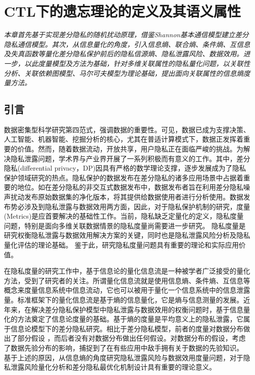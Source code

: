
\chapter{CTL下的遗忘理论的定义及其语义属性}\label{chapter03}
{\em 本章首先基于实现差分隐私的随机扰动原理，借鉴Shannon基本通信模型建立差分隐私通信模型。其次，从信息量化的角度，引入信息熵、联合熵、条件熵、互信息及失真函数等量化差分隐私保护前后的隐私信源熵、隐私泄露风险、数据效用。进一步，以此度量模型及方法为基础，针对多维关联属性的隐私量化问题，以关联性分析、关联依赖图模型、马尔可夫模型为理论基础，提出面向关联属性的信息熵度量方法。}

\section{引言}
数据密集型科学研究第四范式\cite{hey2009the}，强调数据的重要性。可见，数据已成为支撑决策、人工智能、机器智能、挖掘分析的核心，尤其在普适计算模式下，数据正发挥着重要的价值。然而，随着数据流动，开放共享，用户隐私正在面临严峻的挑战。为解决隐私泄露问题，学术界与产业界开展了一系列积极而有意义的工作。其中，差分隐私(differential privacy，DP)\cite{dwork2006differential,dwork2006calibrating}因具有严格的数学理论支撑，逐步发展成为了隐私保护领域研究的热点。隐私保护的数据发布在差分隐私的诸多应用场景中占据着重要的地位。如在差分隐私的非交互式数据发布中，数据发布者旨在利用差分隐私噪声扰动发布原始数据集的净化版本，将其提供给数据使用者进行分析使用。数据发布势必涉及到隐私泄露与数据效用两方面，因此，对于隐私保护机制的研究，度量(Metrics)是应首要解决的基础性工作。当前，隐私缺乏定量化的定义\cite{Lifenghua16}，隐私度量问题，特别是面向多维关联数据情景的隐私度量尚需要进一步研究\cite{ningbowu2019}。%
隐私度量是研究权衡隐私泄露与数据效用\cite{sankar2013utility,kalantari2018robust}解决方案的关键，同时也是隐私泄露风险分析及隐私量化评估的理论基础。 鉴于此，研究隐私度量问题具有重要的理论和实际应用价值。

在隐私度量\cite{alvim2012measuring,wagner2018technical,peng2016,xiongjinbo2018}的研究工作中，基于信息论的量化信息流\cite{smith2009on,boreale2015quantitative,alvim2011on,alvim2010differential}是一种被学者广泛接受的量化方法，受到了研究者的关注。所谓量化信息流就是使用信息熵、条件熵、互信息等概念来度量信息系统中信息流动，它也可以被用于量化一个信息系统中的信息泄露量。标准框架下的量化信息流是基于熵的信息量化，它是熵与信息测量\cite{renyi1961on}的发展。近年来，在解决差分隐私保护模型中隐私泄露与数据效用的权衡问题时，基于信息量化的方法奠定了信息论度量的基础\cite{mir2012information,alvim2011differential,wang2016on}。基于熵的度量是平均意义上的隐私泄露，它属于信息论模型下的差分隐私研究\cite{sarwate2014a}。相比于差分隐私模型\cite{dwork2006differential,dwork2006calibrating}，前者的度量对数据分布做出了部分假设 ，而后者没有对数据分布做出任何假设。对数据分布的假设，考虑了数据先验分布的影响，捕捉到了在有些应用中敌手拥有关于数据的先验知识\cite{kalantari2018robust}。 基于上述的原因，从信息熵的角度研究隐私泄露风险与数据效用度量问题，对于隐私泄露风险量化分析和差分隐私最优化机制设计具有重要的理论意义。


